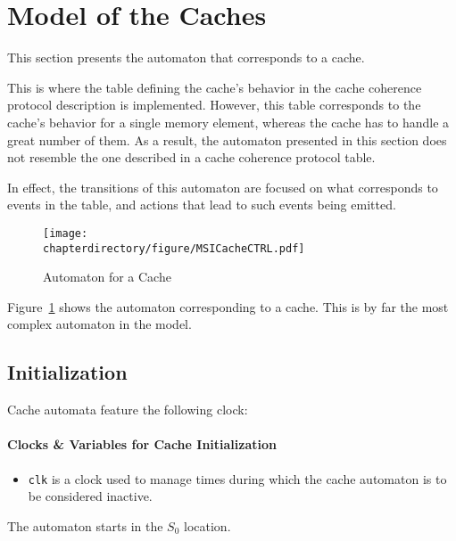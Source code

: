\section{Model of the Caches}
\label{sec:model:cache}
This section presents the automaton that corresponds to a cache.

This is where the table defining the cache's behavior in the cache coherence
protocol description is implemented. However, this table corresponds to the
cache's behavior for a single memory element, whereas the cache has to handle
a great number of them. As a result, the automaton presented in this section
does not resemble the one described in a cache coherence protocol table.
\iffalse
Instead, the behavior described by the table is implemented by the automaton's
transitions, but the coherence states are stored within a local variable array.
\fi
In effect, the transitions of this automaton are focused on what corresponds to
events in the table, and actions that lead to such events being emitted.

\begin{figure}[hbt!]
\begin{center}
\texttt{[image: \\chapterdirectory/figure/MSICacheCTRL.pdf]}
\end{center}
\caption{Automaton for a Cache}
\label{fig:UPPAAL:MSICacheCTRL}
\end{figure}

Figure~\ref{fig:UPPAAL:MSICacheCTRL} shows the automaton corresponding to a
cache. This is by far the most complex automaton in the model.

\subsection{Initialization}
Cache automata feature the following clock:
\paragraph{Clocks \& Variables for Cache Initialization}
\begin{itemize}
\item
   \lstinline!clk! is a clock used to manage times during which the cache
   automaton is to be considered inactive.
\end{itemize}

The automaton starts in the $S_0$ location.

